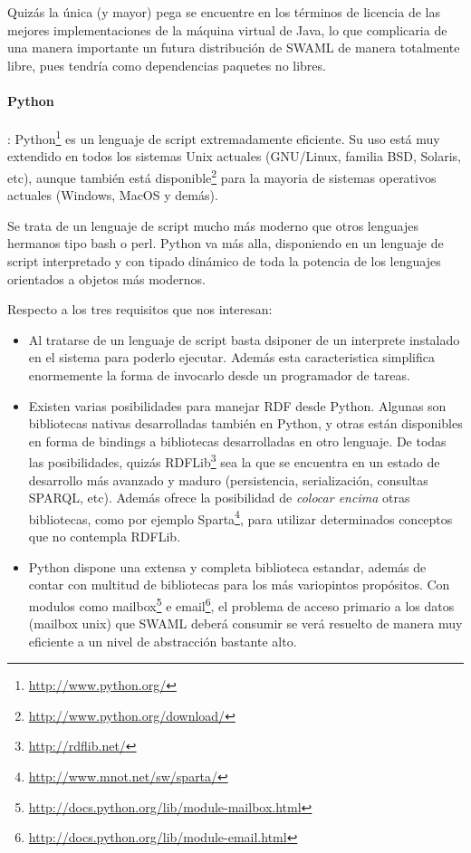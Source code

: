 Quizás la única (y mayor) pega se encuentre en los términos de licencia de las 
mejores implementaciones de la máquina virtual de Java, lo que complicaria de una
manera importante un futura distribución de SWAML de manera totalmente libre,
pues tendría como dependencias paquetes no libres.


\paragraph{Python}: Python\footnote{\url{http://www.python.org/}} es un lenguaje de 
script extremadamente eficiente. Su uso está muy extendido en todos los sistemas 
Unix actuales (GNU/Linux, familia BSD, Solaris, etc), aunque también está disponible\footnote{\url{http://www.python.org/download/}} para la mayoria de sistemas 
operativos actuales (Windows, MacOS y demás).

Se trata de un lenguaje de script mucho más moderno que otros lenguajes hermanos 
tipo bash o perl. Python va más alla, disponiendo en un lenguaje de script 
interpretado y con tipado dinámico de toda la potencia de los lenguajes orientados 
a objetos más modernos.

Respecto a los tres requisitos que nos interesan:

\begin{itemize}
  \item Al tratarse de un lenguaje de script basta dsiponer de un interprete 
	instalado en el sistema para poderlo ejecutar. Además esta caracteristica
	simplifica enormemente la forma de invocarlo desde un programador de
	tareas.
  \item Existen varias posibilidades para manejar RDF desde Python. Algunas son
	bibliotecas nativas desarrolladas también en Python, y otras están
	disponibles en forma de bindings a bibliotecas desarrolladas en otro 
	lenguaje.
	De todas las posibilidades, quizás RDFLib\footnote{\url{http://rdflib.net/}}
	sea la que se encuentra en un estado de desarrollo más avanzado y maduro 
	(persistencia, serialización, consultas SPARQL, etc).
	Además ofrece la posibilidad de \emph{colocar encima} otras bibliotecas,
	como por ejemplo Sparta\footnote{\url{http://www.mnot.net/sw/sparta/}},
	para utilizar determinados conceptos que no contempla RDFLib.
  \item Python dispone una extensa y completa biblioteca estandar, además de contar
	con multitud de bibliotecas para los más variopintos propósitos. Con modulos 
	como mailbox\footnote{\url{http://docs.python.org/lib/module-mailbox.html}}
	e email\footnote{\url{http://docs.python.org/lib/module-email.html}}, el
	problema de acceso primario a los datos (mailbox unix) que SWAML deberá
	consumir se verá resuelto de manera muy eficiente a un nivel de abstracción
	bastante alto.
\end{itemize}

